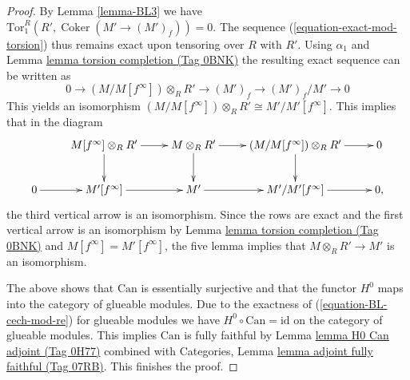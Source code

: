 \documentclass{amsart}
\theoremstyle{plain}
\theoremstyle{definition}
\theoremstyle{remark}
\numberwithin{equation}{subsection}
\def\Coker{\mathop{\mathrm{Coker}}}
\begin{document}
\begin{proof}
\medskip\noindent
By Lemma \ref{lemma-BL3} we have
$\text{Tor}_1^R(R', \Coker(M' \to (M')_f)) = 0$.
The sequence (\ref{equation-exact-mod-torsion})
thus remains exact upon tensoring
over $R$ with $R'$. Using $\alpha_1$ and
Lemma \href{https://stacks.math.columbia.edu/tag/0BNK}{lemma torsion completion (Tag 0BNK)}
the resulting exact sequence can be written as
\begin{equation}
\label{equation-mod-torsion-sequence}
0 \to (M/M[f^\infty]) \otimes_R R' \to
(M')_f \to (M')_f/M' \to 0
\end{equation}
This yields an isomorphism
$(M/M[f^\infty]) \otimes_R R' \cong M'/M'[f^\infty]$.
This implies that in the diagram
$$
\xymatrix{
& M[f^\infty] \otimes_R R' \ar[r] \ar[d] &
M \otimes_R R'  \ar[r] \ar[d] &
(M/M[f^\infty]) \otimes_R R' \ar[r] \ar[d] & 0 \\
0 \ar[r] &
M'[f^\infty] \ar[r] &
M' \ar[r] &
M'/M'[f^\infty] \ar[r] & 0,
}
$$
the third vertical arrow is an isomorphism. Since the rows are exact and the
first vertical arrow is an isomorphism by
Lemma \href{https://stacks.math.columbia.edu/tag/0BNK}{lemma torsion completion (Tag 0BNK)} and $M[f^\infty] = M'[f^\infty]$,
the five lemma implies that $M \otimes_R R' \to M'$ is an isomorphism.

\medskip\noindent
The above shows that $\text{Can}$ is essentially surjective and that
the functor $H^0$ maps into the category of glueable modules.
Due to the exactness of (\ref{equation-BL-cech-mod-re}) for glueable modules
we have $H^0 \circ \text{Can} = \text{id}$ on the
category of glueable modules. This implies $\text{Can}$ is fully
faithful by Lemma \href{https://stacks.math.columbia.edu/tag/0H77}{lemma H0 Can adjoint (Tag 0H77)} combined with
Categories, Lemma \href{https://stacks.math.columbia.edu/tag/07RB}{lemma adjoint fully faithful (Tag 07RB)}.
This finishes the proof.
\end{proof}
\end{document}
